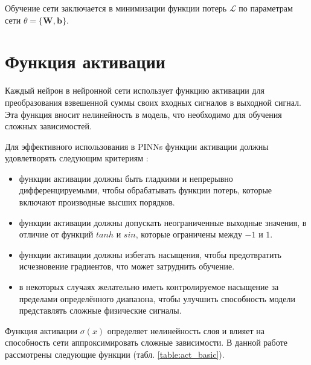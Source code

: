 Обучение сети заключается в минимизации функции потерь $\mathcal{L}$ по параметрам сети $\theta = \{\mathbf{W}, \mathbf{b}\}$.


\section{Функция активации}
Каждый нейрон в нейронной сети использует функцию активации для преобразования взвешенной
суммы своих входных сигналов в выходной сигнал. Эта функция вносит нелинейность в модель,
что необходимо для обучения сложных зависимостей.

Для эффективного использования в PINNs функции активации должны удовлетворять следующим
критериям \cite{0d752c79fb816703274a3d37f85a85689a2a9405}:
\begin{itemize}
    \item функции активации должны быть гладкими и
    непрерывно дифференцируемыми, чтобы обрабатывать функции потерь, которые включают
    производные высших порядков.
    \item функции активации должны допускать неограниченные
    выходные значения, в отличие от функций $tanh$ и $sin$, которые ограничены между $-1$ и $1$.
    \item функции активации должны избегать насыщения, чтобы предотвратить
    исчезновение градиентов, что может затруднить обучение.
    \item в некоторых случаях желательно иметь контролируемое насыщение за пределами определённого
    диапазона, чтобы улучшить способность модели представлять сложные физические сигналы.
\end{itemize}


Функция активации $\sigma(x)$ определяет нелинейность слоя и влияет на способность
сети аппроксимировать сложные зависимости. В данной работе рассмотрены следующие функции
(табл. \ref{table:act_basic}).

